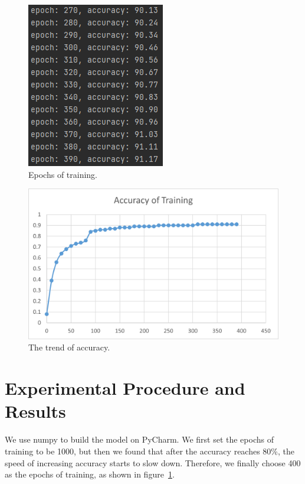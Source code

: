 \documentclass[twoside,twocolumn]{article}
\begin{document}
\begin{figure}[t]
\begin{minipage}[t]{0.3\textwidth}
		\centering
		\includegraphics[scale=0.7, clip=true]{fig/3.png}
	\end{minipage}
	\vspace{-2mm}
	\caption{Epochs of training.}
	\label{fig:epoch}
	\vspace{-2mm}
\end{figure}

\begin{figure}[ht]
	\centering
	\includegraphics[scale=0.9, clip=true]{fig/Result.png}
	\vspace{-2mm}
	\caption{The trend of accuracy.}
	\label{fig:trend}
	\vspace{-5mm}
\end{figure}

\section{Experimental Procedure and Results}

We use numpy to build the model on PyCharm. We first set the epochs of training to be 1000, but then we found that after the accuracy reaches 80\%, the speed of increasing accuracy starts to slow down. Therefore, we finally choose 400 as the epochs of training, as shown in figure~\ref{fig:epoch}.
\end{document}
